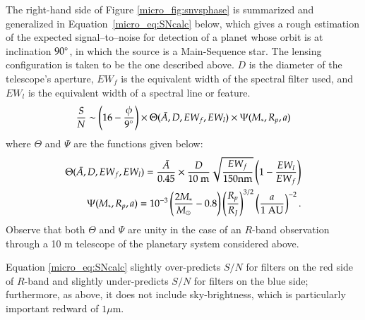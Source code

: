 The right-hand side of Figure \ref{micro_fig:snvsphase} is summarized and
generalized in Equation~\ref{micro_eq:SNcalc} below, which gives a rough
estimation of the expected signal--to--noise for detection of a planet
whose orbit is at inclination $90\mbox{$^\circ$}$, in which the source is a
Main-Sequence star.  The lensing configuration is taken to be the one
described above.  $D$ is the diameter of the telescope's aperture,
$EW_f$ is the equivalent width of the spectral filter used, and $EW_l$
is the equivalent width of a spectral line or feature.
\begin{equation}
\label{micro_eq:SNcalc}
\frac{S}{N} \sim \left( 16 - \frac{\phi}{9\mbox{$^\circ$}}\right) \times
      \Theta(\bar{A}, D, EW_f, EW_l) \times \Psi(M_*, R_p, a)
\end{equation}
where $\Theta$ and $\Psi$ are the functions given below:
\begin{eqnarray}
\label{micro_eq:Theta}
\Theta(\bar{A}, D, EW_f, EW_l) = \frac{\bar{A}}{0.45} \times
                                 \frac{D}{10{\rm~m}}
                                 \sqrt{\frac{EW_f}{150{\rm nm}}}
                                 \left(1-\frac{EW_l}{EW_f}\right) \\
\label{micro_eq:Psi}
\Psi(M_*, R_p, a)  = 10^{-3} \left( \frac{2M_*}{M_\odot} -0.8 \right)
                            \left( \frac{R_p}{R_J} \right)^{3/2} 
                            \left( \frac{a}{1~{\rm AU}}\right)^{-2}.
\end{eqnarray}
Observe that both $\Theta$ and $\Psi$ are unity in the case of an
$R$-band observation through a 10 m telescope of the planetary system
considered above.

Equation \ref{micro_eq:SNcalc} slightly over-predicts $S/N$ for filters on
the red side of $R$-band and slightly under-predicts $S/N$ for filters
on the blue side; furthermore, as above, it does not include
sky-brightness, which is particularly important redward of $1\mu$m.


